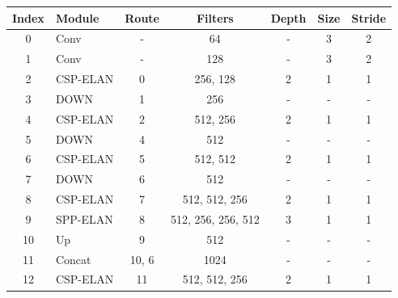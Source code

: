 \begin{table}[H]
  \centering
  \begin{tabular}{|c|l|c|c|c|c|c|}
    \hline
    \textbf{Index} & \textbf{Module} & \textbf{Route} & \textbf{Filters}   & \textbf{Depth} & \textbf{Size} & \textbf{Stride} \\ \hline
    0              & Conv            & -              & 64                 & -              & 3             & 2               \\ \hline
    1              & Conv            & -              & 128                & -              & 3             & 2               \\ \hline
    2              & CSP-ELAN        & 0              & 256, 128           & 2              & 1             & 1               \\ \hline
    3              & DOWN            & 1              & 256                & -              & -             & -               \\ \hline
    4              & CSP-ELAN        & 2              & 512, 256           & 2              & 1             & 1               \\ \hline
    5              & DOWN            & 4              & 512                & -              & -             & -               \\ \hline
    6              & CSP-ELAN        & 5              & 512, 512           & 2              & 1             & 1               \\ \hline
    7              & DOWN            & 6              & 512                & -              & -             & -               \\ \hline
    8              & CSP-ELAN        & 7              & 512, 512, 256      & 2              & 1             & 1               \\ \hline
    9              & SPP-ELAN        & 8              & 512, 256, 256, 512 & 3              & 1             & 1               \\ \hline
    10             & Up              & 9              & 512                & -              & -             & -               \\ \hline
    11             & Concat          & 10, 6          & 1024               & -              & -             & -               \\ \hline
    12             & CSP-ELAN        & 11             & 512, 512, 256      & 2              & 1             & 1               \\ \hline

\end{tabular}
\end{table}

